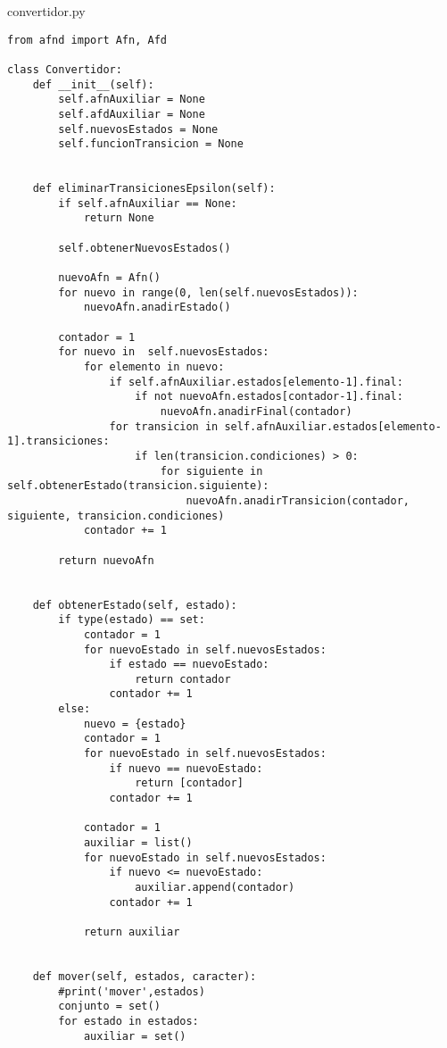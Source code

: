 \vspace{3em}

convertidor.py
\lstset{language=Python, breaklines=true, basicstyle=\footnotesize}
\begin{lstlisting}[frame=single]
from afnd import Afn, Afd

class Convertidor:
    def __init__(self):
        self.afnAuxiliar = None
        self.afdAuxiliar = None
        self.nuevosEstados = None
        self.funcionTransicion = None


    def eliminarTransicionesEpsilon(self):
        if self.afnAuxiliar == None:
            return None

        self.obtenerNuevosEstados()

        nuevoAfn = Afn()
        for nuevo in range(0, len(self.nuevosEstados)):
            nuevoAfn.anadirEstado()

        contador = 1
        for nuevo in  self.nuevosEstados:
            for elemento in nuevo:
                if self.afnAuxiliar.estados[elemento-1].final:
                    if not nuevoAfn.estados[contador-1].final:
                        nuevoAfn.anadirFinal(contador)
                for transicion in self.afnAuxiliar.estados[elemento-1].transiciones:
                    if len(transicion.condiciones) > 0:
                        for siguiente in self.obtenerEstado(transicion.siguiente):
                            nuevoAfn.anadirTransicion(contador, siguiente, transicion.condiciones)
            contador += 1

        return nuevoAfn


    def obtenerEstado(self, estado):
        if type(estado) == set:
            contador = 1
            for nuevoEstado in self.nuevosEstados:
                if estado == nuevoEstado:
                    return contador
                contador += 1
        else:
            nuevo = {estado}
            contador = 1
            for nuevoEstado in self.nuevosEstados:
                if nuevo == nuevoEstado:
                    return [contador]
                contador += 1

            contador = 1
            auxiliar = list()
            for nuevoEstado in self.nuevosEstados:
                if nuevo <= nuevoEstado:
                    auxiliar.append(contador)
                contador += 1

            return auxiliar


    def mover(self, estados, caracter):
        #print('mover',estados)
        conjunto = set()
        for estado in estados:
            auxiliar = set()


\end{lstlisting}
